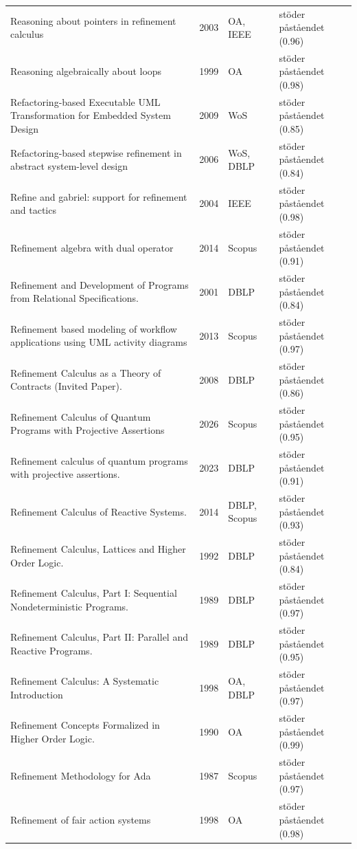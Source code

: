 \begin{longtable}{@{}%
  >{\raggedright\arraybackslash}p{}c%
  >{\raggedright\arraybackslash}p{}%
  >{\raggedright\arraybackslash}p{}@{}}
Reasoning about pointers in refinement calculus & 2003 & OA, IEEE & stöder påståendet (0.96) \\
Reasoning algebraically about loops & 1999 & OA & stöder påståendet (0.98) \\
Refactoring-based Executable UML Transformation for Embedded System Design & 2009 & WoS & stöder påståendet (0.85) \\
Refactoring-based stepwise refinement in abstract system-level design & 2006 & WoS, DBLP & stöder påståendet (0.84) \\
Refine and gabriel: support for refinement and tactics & 2004 & IEEE & stöder påståendet (0.98) \\
Refinement algebra with dual operator & 2014 & Scopus & stöder påståendet (0.91) \\
Refinement and Development of Programs from Relational Specifications. & 2001 & DBLP & stöder påståendet (0.84) \\
Refinement based modeling of workflow applications using UML activity diagrams & 2013 & Scopus & stöder påståendet (0.97) \\
Refinement Calculus as a Theory of Contracts (Invited Paper). & 2008 & DBLP & stöder påståendet (0.86) \\
Refinement Calculus of Quantum Programs with Projective Assertions & 2026 & Scopus & stöder påståendet (0.95) \\
Refinement calculus of quantum programs with projective assertions. & 2023 & DBLP & stöder påståendet (0.91) \\
Refinement Calculus of Reactive Systems. & 2014 & DBLP, Scopus & stöder påståendet (0.93) \\
Refinement Calculus, Lattices and Higher Order Logic. & 1992 & DBLP & stöder påståendet (0.84) \\
Refinement Calculus, Part I: Sequential Nondeterministic Programs. & 1989 & DBLP & stöder påståendet (0.97) \\
Refinement Calculus, Part II: Parallel and Reactive Programs. & 1989 & DBLP & stöder påståendet (0.95) \\
Refinement Calculus: A Systematic Introduction & 1998 & OA, DBLP & stöder påståendet (0.97) \\
Refinement Concepts Formalized in Higher Order Logic. & 1990 & OA & stöder påståendet (0.99) \\
Refinement Methodology for Ada & 1987 & Scopus & stöder påståendet (0.97) \\
Refinement of fair action systems & 1998 & OA & stöder påståendet (0.98) \\

\end{longtable}
